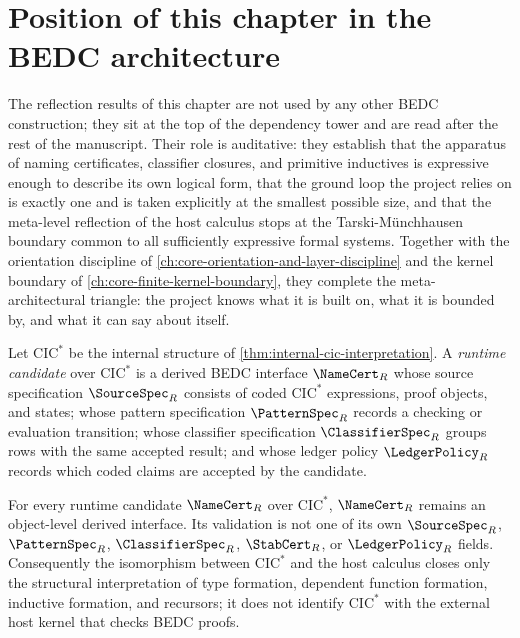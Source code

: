 \section{Position of this chapter in the BEDC architecture}
\label{sec:reflection-position}

The reflection results of this chapter are not used by any other BEDC construction; they sit at the top of the dependency tower and are read after the rest of the manuscript. Their role is auditative: they establish that the apparatus of naming certificates, classifier closures, and primitive inductives is expressive enough to describe its own logical form, that the ground loop the project relies on is exactly one and is taken explicitly at the smallest possible size, and that the meta-level reflection of the host calculus stops at the Tarski-M\"unchhausen boundary common to all sufficiently expressive formal systems. Together with the orientation discipline of \autoref{ch:core-orientation-and-layer-discipline} and the kernel boundary of \autoref{ch:core-finite-kernel-boundary}, they complete the meta-architectural triangle: the project knows what it is built on, what it is bounded by, and what it can say about itself.


\begin{definition}
\label{def:reflection-runtime-candidate}
Let $\mathrm{CIC}^{*}$ be the internal structure of \autoref{thm:internal-cic-interpretation}. A \emph{runtime candidate} over $\mathrm{CIC}^{*}$ is a derived BEDC interface $\NameCert_R$ whose source specification $\SourceSpec_R$ consists of coded $\mathrm{CIC}^{*}$ expressions, proof objects, and states; whose pattern specification $\PatternSpec_R$ records a checking or evaluation transition; whose classifier specification $\ClassifierSpec_R$ groups rows with the same accepted result; and whose ledger policy $\LedgerPolicy_R$ records which coded claims are accepted by the candidate.
\end{definition}

\begin{theorem}
\label{thm:reflection-structure-existence-boundary}
For every runtime candidate $\NameCert_R$ over $\mathrm{CIC}^{*}$, $\NameCert_R$ remains an object-level derived interface. Its validation is not one of its own $\SourceSpec_R$, $\PatternSpec_R$, $\ClassifierSpec_R$, $\StabCert_R$, or $\LedgerPolicy_R$ fields. Consequently the isomorphism between $\mathrm{CIC}^{*}$ and the host calculus closes only the structural interpretation of type formation, dependent function formation, inductive formation, and recursors; it does not identify $\mathrm{CIC}^{*}$ with the external host kernel that checks BEDC proofs.
\end{theorem}

